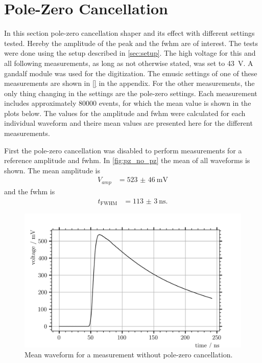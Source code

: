 \section{Pole-Zero Cancellation}

In this section pole-zero cancellation shaper and its effect with different settings tested.
Hereby the amplitude of the peak and the \ac{fwhm} are of interest.
The tests were done using the setup described in \autoref{sec:setup}.
The high voltage for this and all following measurements, as long as not otherwise stated, was set to \SI{43}{\volt}. 
A \ac{gandalf} module was used for the digitization.
The \ac{emusic} settings of one of these measurements are shown in \autoref{} in the appendix.
For the other measurements, the only thing changing in the settings are the pole-zero settings.
Each measurement includes approximately \num{80000} events, for which the mean value is shown in the plots below.
The values for the amplitude and \ac{fwhm} were calculated for each individual waveform and theire mean values are presented here for the different measurements.

First the pole-zero cancellation was disabled to perform measurements for a reference amplitude and \ac{fwhm}.
In \autoref{fig:pz_no_pz} the mean of all waveforms is shown.
The mean amplitude is 
\begin{align}
    V_{amp} &= \SI{523(46)}{\milli\volt}
\end{align}
and the \ac{fwhm} is
\begin{align}
    t_\text{FWHM} &= \SI{113(3)}{\nano\second}.
\end{align}
\begin{figure}
	\centering
	\includegraphics[width=1.\textwidth]{pictures/pz_no_pz}
	\caption[Mean waveform for a measurement without pole-zero cancellation.]{Mean waveform for a measurement without pole-zero cancellation.}
	\label{fig:pz_no_pz}
\end{figure}

